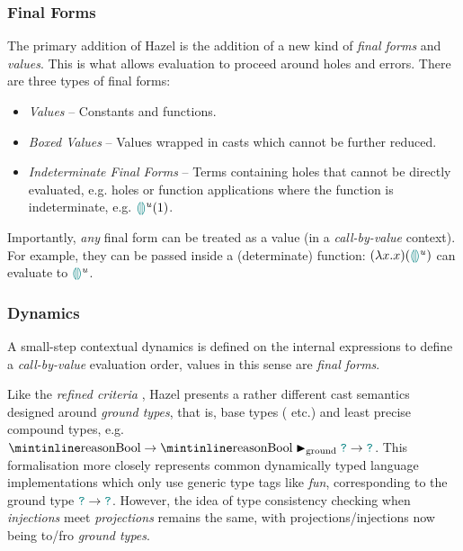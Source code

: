 \subsubsection{Final Forms}\label{sec:HazelFinalForms}
The primary addition of Hazel is the addition of a new kind of \textit{final forms} and \textit{values}. This is what allows evaluation to proceed around holes and errors. There are three types of final forms:
\begin{itemize}
\item \textit{Values} -- Constants and functions.
\item \textit{Boxed Values} -- Values wrapped in casts which cannot be further reduced.
\item \textit{Indeterminate Final Forms} -- Terms containing holes that cannot be directly evaluated, e.g. holes or function applications where the function is indeterminate, e.g. ${\color{teal}\llparenthesis}  {\color{teal}\rrparenthesis}^u(1)$.
\end{itemize}
 Importantly, \textit{any} final form can be treated as a value (in a \textit{call-by-value} context). For example, they can be passed inside a (determinate) function: $(\lambda x. x)({\color{teal}\llparenthesis}  {\color{teal}\rrparenthesis}^u)$ can evaluate to ${\color{teal}\llparenthesis}  {\color{teal}\rrparenthesis}^u$.

\subsubsection{Dynamics}\label{sec:HazelDynamics}
A small-step contextual dynamics \cite[ch. 5]{PracticalFoundations} is defined on the internal expressions to define a \textit{call-by-value} evaluation order, values in this sense are \textit{final forms}. 

Like the \textit{refined criteria}  \cite{GradualRefined}, Hazel presents a rather different cast semantics designed around \textit{ground types}, that is, base types ( etc.) and least precise compound types, e.g. $\code{Bool} \to \code{Bool} \groundmatch \dyn \to \dyn$. This formalisation more closely represents common dynamically typed language implementations which only use generic type tags like \textit{fun}, corresponding to the ground type ${\color{teal}\texttt{?}} \to {\color{teal}\texttt{?}}$. However, the idea of type consistency checking when \textit{injections} meet \textit{projections} remains the same, with projections/injections now being to/fro \textit{ground types}.


